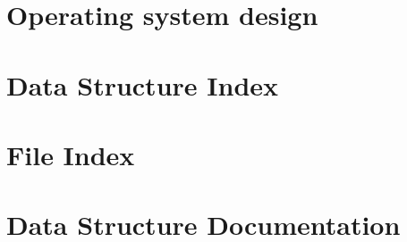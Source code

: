 \documentclass[twoside]{book}
\newcommand{\+}{\discretionary{\mbox{\scriptsize$\hookleftarrow$}}{}{}}
\begin{document}
\chapter{Operating system design}
\label{df/d86/a00012}
\hypertarget{df/d86/a00012}{}

\chapter{Data Structure Index}

\chapter{File Index}

\chapter{Data Structure Documentation}

\end{document}
